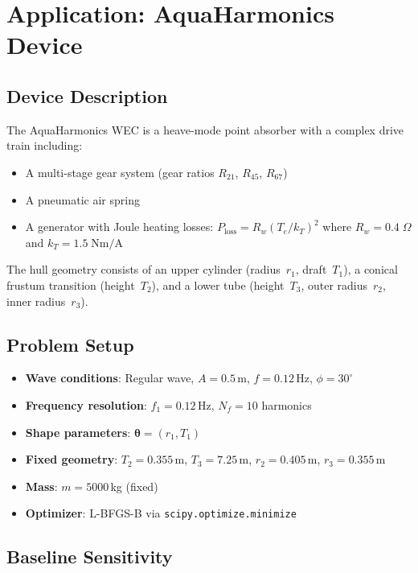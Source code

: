 \documentclass[11pt,a4paper]{article}
\newcommand{\btheta}{\bm{\theta}}
\begin{document}
\section{Application: AquaHarmonics Device}
\label{sec:application}

\subsection{Device Description}

The AquaHarmonics WEC is a heave-mode point absorber with a
complex drive train including:
\begin{itemize}
    \item A multi-stage gear system (gear ratios $R_{21}$, $R_{45}$,
          $R_{67}$)
    \item A pneumatic air spring
    \item A generator with Joule heating losses:
          $P_{\mathrm{loss}} = R_w (T_e / k_T)^2$
          where $R_w = 0.4\;\Omega$ and $k_T = 1.5\;\mathrm{Nm/A}$
\end{itemize}

The hull geometry consists of an upper cylinder (radius~$r_1$,
draft~$T_1$), a conical frustum transition (height~$T_2$), and a
lower tube (height~$T_3$, outer radius~$r_2$, inner radius~$r_3$).

\subsection{Problem Setup}

\begin{itemize}
    \item \textbf{Wave conditions}: Regular wave,
          $A = 0.5$\,m, $f = 0.12$\,Hz, $\phi = 30^\circ$
    \item \textbf{Frequency resolution}: $f_1 = 0.12$\,Hz,
          $N_f = 10$ harmonics
    \item \textbf{Shape parameters}: $\btheta = (r_1, T_1)$
    \item \textbf{Fixed geometry}: $T_2 = 0.355$\,m,
          $T_3 = 7.25$\,m, $r_2 = 0.405$\,m, $r_3 = 0.355$\,m
    \item \textbf{Mass}: $m = 5000$\,kg (fixed)
    \item \textbf{Optimizer}: L-BFGS-B via
          \texttt{scipy.optimize.minimize}
\end{itemize}

\subsection{Baseline Sensitivity}
\end{document}
